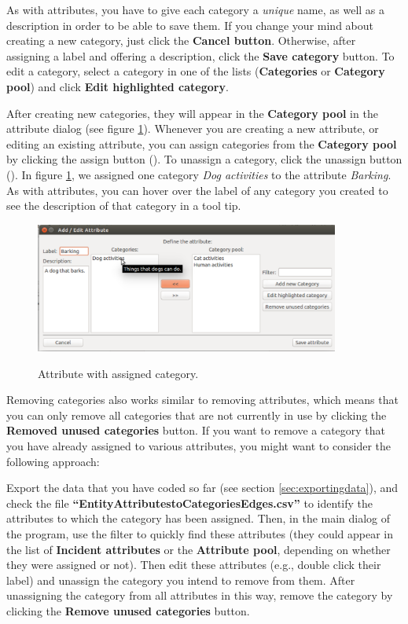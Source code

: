 \documentclass{memoir}
\begin{document}
As with attributes, you have to give each category a \emph{unique} name, as well as a description in order to be able to save them. If you change your mind about creating a new category, just click the \textbf{Cancel button}. Otherwise, after assigning a label and offering a description, click the \textbf{Save category} button. To edit a category, select a category in one of the lists (\textbf{Categories} or \textbf{Category pool}) and click \textbf{Edit highlighted category}.

After creating new categories, they will appear in the \textbf{Category pool} in the attribute dialog (see figure \ref{fig:attributedialogwithcategories}). Whenever you are creating a new attribute, or editing an existing attribute, you can assign categories from the \textbf{Category pool} by clicking the assign button (\textbf{\guillemotleft}). To unassign a category, click the unassign button (\textbf{\guillemotright}). In figure \ref{fig:attributedialogwithcategories}, we assigned one category \emph{Dog activities} to the attribute \emph{Barking}. As with attributes, you can hover over the label of any category you created to see the description of that category in a tool tip. 

\begin{figure}[h!]
  \centering
  \caption{Attribute with assigned category.}
  \includegraphics[width=100mm]{Screenshot_12.pdf}
  \label{fig:attributedialogwithcategories}
\end{figure}

Removing categories also works similar to removing attributes, which means that you can only remove all categories that are not currently in use by clicking the \textbf{Removed unused categories} button. If you want to remove a category that you have already assigned to various attributes, you might want to consider the following approach:

Export the data that you have coded so far (see section \ref{sec:exportingdata}), and check the file \textbf{``Entity\textunderscore Attributes\textunderscore to\textunderscore Categories\textunderscore Edges.csv''} to identify the attributes to which the category has been assigned. Then, in the main dialog of the program, use the filter to quickly find these attributes (they could appear in the list of \textbf{Incident attributes} or the \textbf{Attribute pool}, depending on whether they were assigned or not). Then edit these attributes (e.g., double click their label) and unassign the category you intend to remove from them. After unassigning the category from all attributes in this way, remove the category by clicking the \textbf{Remove unused categories} button.
\end{document}
